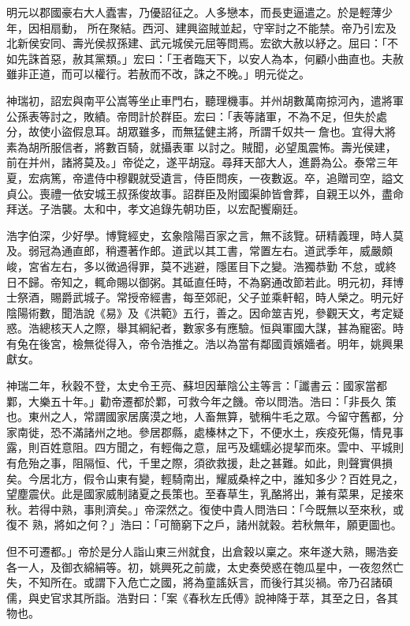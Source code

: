 \begin{pinyinscope}
 明元以郡國豪右大人蠹害，乃優詔征之。人多戀本，而長吏逼遣之。於是輕薄少年，因相扇動，
 所在聚結。西河、建興盜賊並起，守宰討之不能禁。帝乃引宏及北新侯安同、壽光侯叔孫建、武元城侯元屈等問焉。宏欲大赦以紓之。屈曰：「不如先誅首惡，赦其黨類。」宏曰：「王者臨天下，以安人為本，何顧小曲直也。夫赦雖非正道，而可以權行。若赦而不改，誅之不晚。」明元從之。



 神瑞初，詔宏與南平公嵩等坐止車門右，聽理機事。并州胡數萬南掠河內，遣將軍公孫表等討之，敗績。帝問計於群臣。宏曰：「表等諸軍，不為不足，但失於處分，故使小盜假息耳。胡眾雖多，而無猛健主將，所謂千奴共一詹也。宜得大將素為胡所服信者，將數百騎，就攝表軍
 以討之。賊聞，必望風震怖。壽光侯建，前在并州，諸將莫及。」帝從之，遂平胡寇。尋拜天部大人，進爵為公。泰常三年夏，宏病篤，帝遣侍中穆觀就受遺言，侍臣問疾，一夜數返。卒，追贈司空，謚文貞公。喪禮一依安城王叔孫俊故事。詔群臣及附國渠帥皆會葬，自親王以外，盡命拜送。子浩襲。太和中，孝文追錄先朝功臣，以宏配饗廟廷。



 浩字伯深，少好學。博覽經史，玄象陰陽百家之言，無不該覽。研精義理，時人莫及。弱冠為通直郎，稍遷著作郎。道武以其工書，常置左右。道武季年，威嚴頗峻，宮省左右，多以微過得罪，莫不逃避，隱匿目下之變。浩獨恭勤
 不怠，或終日不歸。帝知之，輒命賜以御粥。其砥直任時，不為窮通改節若此。明元初，拜博士祭酒，賜爵武城子。常授帝經書，每至郊祀，父子並乘軒軺，時人榮之。明元好陰陽術數，聞浩說《易》及《洪範》五行，善之。因命筮吉兇，參觀天文，考定疑惑。浩總核天人之際，舉其綱紀者，數家多有應驗。恒與軍國大謀，甚為寵密。時有兔在後宮，檢無從得入，帝令浩推之。浩以為當有鄰國貢嬪嬙者。明年，姚興果獻女。



 神瑞二年，秋穀不登，太史令王亮、蘇坦因華陰公主等言：「讖書云：國家當都鄴，大樂五十年。」勸帝遷都於鄴，可救今年之饑。帝以問浩。浩曰：「非長久
 策也。東州之人，常謂國家居廣漠之地，人畜無算，號稱牛毛之眾。今留守舊都，分家南徙，恐不滿諸州之地。參居郡縣，處榛林之下，不便水土，疾疫死傷，情見事露，則百姓意阻。四方聞之，有輕侮之意，屈丐及蠕蠕必提挈而來。雲中、平城則有危殆之事，阻隔恒、代，千里之際，須欲救援，赴之甚難。如此，則聲實俱損矣。今居北方，假令山東有變，輕騎南出，耀威桑梓之中，誰知多少？百姓見之，望塵震伏。此是國家威制諸夏之長策也。至春草生，乳酪將出，兼有菜果，足接來秋。若得中熟，事則濟矣。」帝深然之。復使中貴人問浩曰：「今既無以至來秋，或復不
 熟，將如之何？」浩曰：「可簡窮下之戶，諸州就穀。若秋無年，願更圖也。



 但不可遷都。」帝於是分人詣山東三州就食，出倉穀以稟之。來年遂大熟，賜浩妾各一人，及御衣綿絹等。初，姚興死之前歲，太史奏熒惑在匏瓜星中，一夜忽然亡失，不知所在。或謂下入危亡之國，將為童謠妖言，而後行其災禍。帝乃召諸碩儒，與史官求其所詣。浩對曰：「案《春秋左氏傅》說神降于萃，其至之日，各其物也。




\end{pinyinscope}
